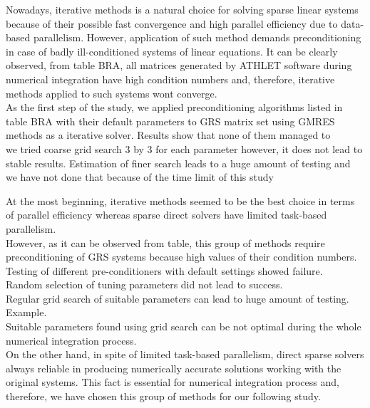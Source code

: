 \label{subseq:hybrid-method-description}


Nowadays, iterative methods is a natural choice for solving sparse linear systems because of their possible fast convergence and high parallel efficiency due to data-based parallelism. However, application of such method demands preconditioning in case of badly ill-conditioned systems of linear equations. It can be clearly observed, from table BRA, all matrices generated by ATHLET software during numerical integration have high condition numbers and, therefore, iterative methods applied to such systems wont converge.\\


As the first step of the study, we applied preconditioning algorithms listed in table BRA with their default parameters to GRS matrix set using GMRES methods as a iterative solver. Results show that none of them managed to \\




we tried coarse grid search 3 by 3 for each parameter however, it does not lead to stable results. Estimation of finer search leads to a huge amount of testing and we have not done that because of the time limit of this study

At the most beginning, iterative methods seemed to be the best choice in terms of parallel efficiency whereas sparse direct solvers have limited task-based parallelism.\\

However, as it can be observed from table, this group of methods require preconditioning of GRS systems because high values of their condition numbers.\\
 

Testing of different pre-conditioners with default settings showed failure.\\

Random selection of tuning parameters did not lead to success.\\


Regular grid search of suitable parameters can lead to huge amount of testing. Example.\\


Suitable parameters found using grid search can be not optimal during the whole numerical integration process.\\


On the other hand, in spite of limited task-based parallelism, direct sparse solvers always reliable in producing numerically accurate solutions working with the original systems. This fact is essential for numerical integration process and, therefore, we have chosen this group of methods for our following study.\\

